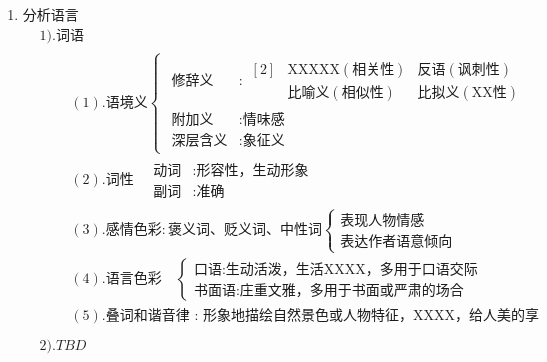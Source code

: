 \documentclass[11pt]{article}
\begin{document}
\begin{enumerate}
\item 分析语言
$$
\begin{aligned}
  & 1). \mbox{词语} \\
  & \quad \begin{aligned}
    & (1). \mbox{语境义}
      \begin{cases} \begin{aligned}
        \mbox{修辞义} &: \begin{aligned}[2]
                       & \mbox{XXXXX} ( \mbox{相关性} ) & \mbox{反语} ( \mbox{讽刺性} ) \\
                       & \mbox{比喻义} ( \mbox{相似性} ) & \mbox{比拟义} ( \mbox{XX性} )
                     \end{aligned} \\
        \mbox{附加义} &: \mbox{情味感} \\
        \mbox{深层含义} &: \mbox{象征义} 
       \end{aligned} \end{cases} \\
    & (2). \mbox{词性}
           \quad \begin{aligned}
             \mbox{动词} & : \mbox{形容性，生动形象} \\
             \mbox{副词} & : \mbox{准确}
           \end{aligned} \\
    & (3). \mbox{感情色彩} : \mbox{褒义词、贬义词、中性词}
           \begin{cases}
              \mbox{表现人物情感} \\
              \mbox{表达作者语意倾向}
           \end{cases} \\
    & (4). \mbox{语言色彩}
           \quad \begin{cases}
              \mbox{口语} : \mbox{生动活泼，生活XXXX，多用于口语交际} \\
              \mbox{书面语} : \mbox{庄重文雅，多用于书面或严肃的场合}
            \end{cases} \\
    & (5). \mbox{叠词和谐音律 : 形象地描绘自然景色或人物特征，XXXX，给人美的享受} \\
    \end{aligned} \\
  & 2). TBD
\end{aligned}
$$

\end{enumerate}
\end{document}
